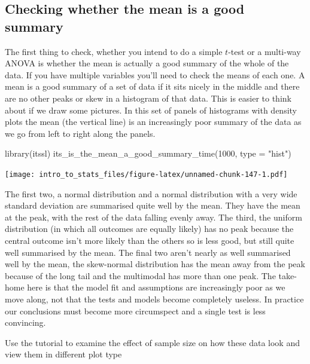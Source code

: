 \documentclass[
]{book}
\newenvironment{Shaded}{\begin{snugshade}}{\end{snugshade}}
\newcommand{\AttributeTok}[1]{\textcolor[rgb]{0.77,0.63,0.00}{#1}}
\newcommand{\DecValTok}[1]{\textcolor[rgb]{0.00,0.00,0.81}{#1}}
\newcommand{\FunctionTok}[1]{\textcolor[rgb]{0.00,0.00,0.00}{#1}}
\newcommand{\NormalTok}[1]{#1}
\newcommand{\StringTok}[1]{\textcolor[rgb]{0.31,0.60,0.02}{#1}}
\newenvironment{task}
{ \begin{tcolorbox}[title=For you to do,title filled] }
{  \end{tcolorbox} }
\begin{document}
\hypertarget{checking-whether-the-mean-is-a-good-summary}{%
\subsection{Checking whether the mean is a good summary}\label{checking-whether-the-mean-is-a-good-summary}}

The first thing to check, whether you intend to do a simple \(t\)-test or a multi-way ANOVA is whether the mean is actually a good summary of the whole of the data. If you have multiple variables you'll need to check the means of each one. A mean is a good summary of a set of data if it sits nicely in the middle and there are no other peaks or skew in a histogram of that data. This is easier to think about if we draw some pictures. In this set of panels of histograms with density plots the mean (the vertical line) is an increasingly poor summary of the data as we go from left to right along the panels.

\begin{Shaded}
\begin{Highlighting}[]
\FunctionTok{library}\NormalTok{(itssl)}
\FunctionTok{its\_is\_the\_mean\_a\_good\_summary\_time}\NormalTok{(}\DecValTok{1000}\NormalTok{, }\AttributeTok{type =} \StringTok{"hist"}\NormalTok{)}
\end{Highlighting}
\end{Shaded}

\texttt{[image: intro\_to\_stats\_files/figure-latex/unnamed-chunk-147-1.pdf]}

The first two, a normal distribution and a normal distribution with a very wide standard deviation are summarised quite well by the mean. They have the mean at the peak, with the rest of the data falling evenly away. The third, the uniform distribution (in which all outcomes are equally likely) has no peak because the central outcome isn't more likely than the others so is less good, but still quite well summarised by the mean. The final two aren't nearly as well summarised well by the mean, the skew-normal distribution has the mean away from the peak because of the long tail and the multimodal has more than one peak. The take-home here is that the model fit and assumptions are increasingly poor as we move along, not that the tests and models become completely useless. In practice our conclusions must become more circumspect and a single test is less convincing.

\begin{task}
Use the tutorial to examine the effect of sample size on how these data look and view them in different plot type
\end{task}
\end{document}
